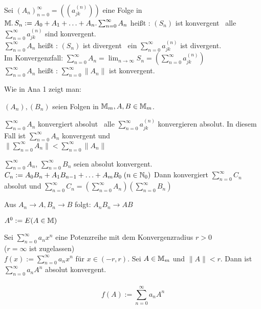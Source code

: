 \documentclass{article}
\begin{document}
\begin{definition}
Sei $(A_n)_{n=0}^\infty = ((a_{jk}^{(n)}))$ eine Folge in $\mathbb{M}. \, S_n := A_0 + A_1 + \ldots + A_n. \\
\sum_{n=0}^{\infty}A_n $ heißt  : \equizu $ (S_n)$ ist konvergent \equizu \, alle $\sum_{n=0}^{\infty}a_{jk}^{(n)}$ sind konvergent. \\
$\sum_{n=0}^{\infty}A_n $ heißt  : \equizu $ (S_n)$ ist divergent \equizu \, ein $\sum_{n=0}^{\infty}a_{jk}^{(n)}$ ist divergent. \\
Im Konvergenzfall: $\sum_{n=0}^{\infty} A_n = \lim_{n \rightarrow \infty} S_n = (\sum_{n=0}^{\infty} a_{jk}^{(n)})$ \\
$\sum_{n=0}^{\infty} A_n$ heißt  : \equizu $\sum_{n=0}^{\infty} \|A_n\|$ ist konvergent.

Wie in Ana 1 zeigt man:
\end{definition}

\begin{satz}
$(A_n), (B_n)$ seien Folgen in $\mathbb{M}_m, A, B \in \mathbb{M}_m$.
\begin{liste}
\item $\sum_{n=0}^{\infty}A_n$ konvergiert absolut \equizu \, alle $\sum_{n=0}^{\infty} a_{jk}^{(n)}$ konvergieren absolut. In diesem Fall ist $\sum_{n=0}^{\infty}A_n$ konvergent und \\
$\|\sum_{n=0}^{\infty}A_n\| < \sum_{n=0}^{\infty}\|A_n\|$
\item $\sum_{n=0}^{\infty}A_n $, $\sum_{n=0}^{\infty}B_n$ seien absolut konvergent. \\
$C_n := A_0B_n + A_1B_{n-1} + \ldots + A_mB_0 \; (n \in \mathbb{N}_0)$
Dann konvergiert $\sum_{n=0}^{\infty}C_n$ absolut und $\sum_{n=0}^{\infty}C_n = (\sum_{n=0}^{\infty}A_n)(\sum_{n=0}^{\infty}B_n)$
\item Aus $A_n \rightarrow A, B_n \rightarrow B$ folgt: $A_nB_n \rightarrow AB$
\end{liste}
\end{satz} 

\begin{definition}
$A^0 := E (A \in \mathbb{M})$
\end{definition}

\begin{satz}
Sei $\sum_{n=0}^{\infty}a_nx^n$ eine Potenzreihe mit dem Konvergenzradius $r > 0$ \\ ($r = \infty$ ist zugelassen) \\ 
$f(x) := \sum_{n=0}^{\infty}a_nx^n$ für $x \in (-r, r)$. Sei $A \in \mathbb{M}_m$ und $\|A\| < r$. Dann ist $\sum_{n=0}^{\infty}a_nA^n$ absolut konvergent.\\\\
$$f(A) := \sum_{n=0}^{\infty}a_nA^n$$
\end{satz}
\end{document}
